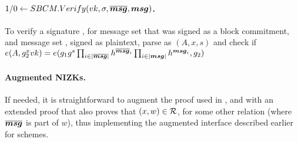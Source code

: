 

\paragraph{$1/0 \gets SBCM.Verify(vk,\sigma,\overline{\boldsymbol{msg}},\boldsymbol{msg})$.} %
To verify a signature \sig, for message set \osmsg that was
signed as a block commitment, and message set \smsg, signed as plaintext, parse
\sig as $(A,x,s)$ and check if $e(A,g_2^xvk) =
e(g_1g^s\prod_{i \in |\overline{\boldsymbol{msg}}|}h^{\overline{\boldsymbol{msg}}_i}
\prod_{i \in |\boldsymbol{msg}|}h^{\boldsymbol{msg}_i},g_2)$

\paragraph{Augmented NIZKs.} %
If needed, it is straightforward to augment the proof \NIZKproof used
in \SBCMBlind, \SBCMSign and \SBCMUnblind  with an extended proof that also
proves that $(x,w) \in \mathcal{R}$, for some other relation \NIZKRel (where
$\overline{\boldsymbol{msg}}$ is part of $w$), thus implementing the augmented interface described
earlier for \SBCM schemes.

